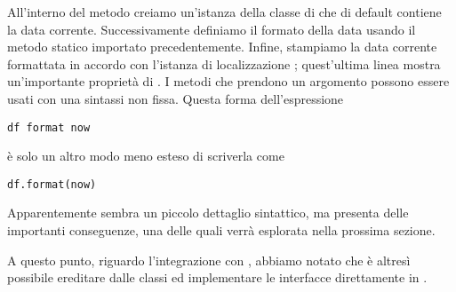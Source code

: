 All'interno del metodo  creiamo un'istanza della classe  di \Java che di default contiene la data corrente. Successivamente definiamo il formato della data usando il metodo statico  importato precedentemente. Infine, stampiamo la data corrente formattata in accordo con l'istanza di localizzazione ; quest'ultima linea mostra un'importante propriet\`a   di \Scala. I metodi che prendono un argomento possono essere usati con una sintassi non fissa. Questa forma dell'espressione
\begin{lstlisting}
df format now
\end{lstlisting}
\`e solo un altro modo meno esteso di scriverla come
\begin{lstlisting}
df.format(now)
\end{lstlisting}
Apparentemente sembra un piccolo dettaglio sintattico, ma presenta delle importanti conseguenze, una delle quali verr\`a   esplorata nella prossima sezione.

A questo punto, riguardo l'integrazione con \Java, abbiamo notato che \`e altres\`i possibile ereditare dalle classi \Java ed implementare le interfacce \Java direttamente in \Scala.